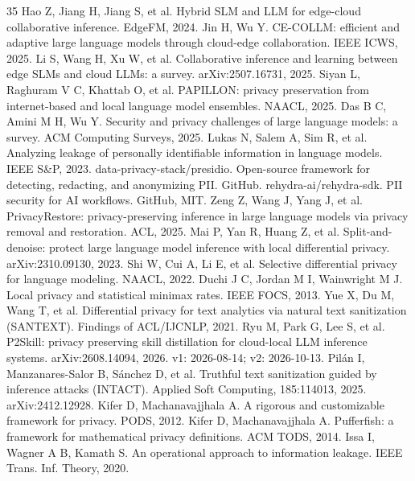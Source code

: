 \documentclass[journal]{IEEEtran}
\begin{document}
\begin{thebibliography}{35}
 Hao Z, Jiang H, Jiang S, et al. Hybrid SLM and LLM for edge-cloud collaborative inference. EdgeFM, 2024.
 Jin H, Wu Y. CE-COLLM: efficient and adaptive large language models through cloud-edge collaboration. IEEE ICWS, 2025.
 Li S, Wang H, Xu W, et al. Collaborative inference and learning between edge SLMs and cloud LLMs: a survey. arXiv:2507.16731, 2025.
 Siyan L, Raghuram V C, Khattab O, et al. PAPILLON: privacy preservation from internet-based and local language model ensembles. NAACL, 2025.
 Das B C, Amini M H, Wu Y. Security and privacy challenges of large language models: a survey. ACM Computing Surveys, 2025.
 Lukas N, Salem A, Sim R, et al. Analyzing leakage of personally identifiable information in language models. IEEE S\&P, 2023.
 data-privacy-stack/presidio. Open-source framework for detecting, redacting, and anonymizing PII. GitHub.
 rehydra-ai/rehydra-sdk. PII security for AI workflows. GitHub, MIT.
 Zeng Z, Wang J, Yang J, et al. PrivacyRestore: privacy-preserving inference in large language models via privacy removal and restoration. ACL, 2025.
 Mai P, Yan R, Huang Z, et al. Split-and-denoise: protect large language model inference with local differential privacy. arXiv:2310.09130, 2023.
 Shi W, Cui A, Li E, et al. Selective differential privacy for language modeling. NAACL, 2022.
 Duchi J C, Jordan M I, Wainwright M J. Local privacy and statistical minimax rates. IEEE FOCS, 2013.
 Yue X, Du M, Wang T, et al. Differential privacy for text analytics via natural text sanitization (SANTEXT). Findings of ACL/IJCNLP, 2021.
 Ryu M, Park G, Lee S, et al. P2Skill: privacy preserving skill distillation for cloud-local LLM inference systems. arXiv:2608.14094, 2026. v1: 2026-08-14; v2: 2026-10-13.
 Pil\'an I, Manzanares-Salor B, S\'anchez D, et al. Truthful text sanitization guided by inference attacks (INTACT). Applied Soft Computing, 185:114013, 2025. arXiv:2412.12928.
 Kifer D, Machanavajjhala A. A rigorous and customizable framework for privacy. PODS, 2012.
 Kifer D, Machanavajjhala A. Pufferfish: a framework for mathematical privacy definitions. ACM TODS, 2014.
 Issa I, Wagner A B, Kamath S. An operational approach to information leakage. IEEE Trans. Inf. Theory, 2020.

\end{thebibliography}
\end{document}
